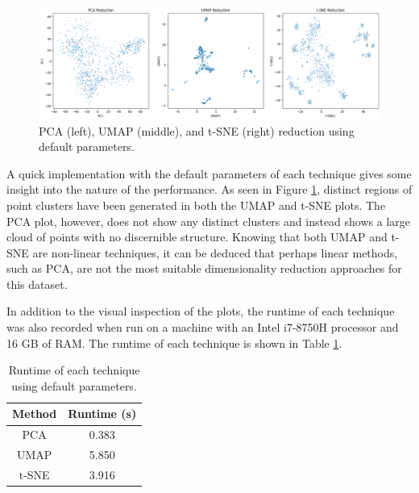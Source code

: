 \documentclass[11pt]{article}
\begin{document}
\begin{figure}[H]
    \centering
    \includegraphics[width=\textwidth]{Images/default_dimred.png}
    \caption{PCA (left), UMAP (middle), and t-SNE (right) reduction using default parameters.}
    \label{fig:default_dimred}
\end{figure}

\vspace{-0.5cm}

A quick implementation with the default parameters of each technique gives some insight into the nature of the performance. As seen in Figure \ref{fig:default_dimred}, distinct regions of point clusters have been generated in both the UMAP and t-SNE plots. The PCA plot, however, does not show any distinct clusters and instead shows a large cloud of points with no discernible structure. Knowing that both UMAP and t-SNE are non-linear techniques, it can be deduced that perhaps linear methods, such as PCA, are not the most suitable dimensionality reduction approaches for this dataset.

In addition to the visual inspection of the plots, the runtime of each technique was also recorded when run on a machine with an Intel i7-8750H processor and 16 GB of RAM. The runtime of each technique is shown in Table \ref{tab:default_dimred}.

\begin{table}[H]
    \centering
    \begin{tabular}{|c|c|}
        \hline
        \textbf{Method} & \textbf{Runtime (s)} \\
        \hline
        PCA & 0.383  \\
        UMAP & 5.850 \\
        t-SNE & 3.916 \\
        \hline
    \end{tabular}
    \caption{Runtime of each technique using default parameters.}
    \label{tab:default_dimred}
\end{table}

\vspace{-0.5cm}
\end{document}
